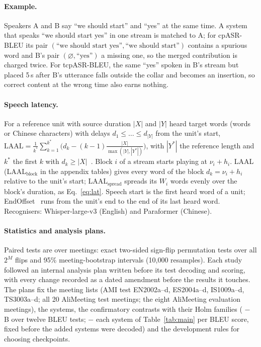 \paragraph{Example.} Speakers A and B say ``we should start'' and ``yes'' at the same time. A system that speaks
``we should start yes'' in one stream is matched to A; for cpASR-BLEU its pair $(\text{``we should start yes''},
\text{``we should start''})$ contains a spurious word and B's pair $(\varnothing,\text{``yes''})$ a missing one, so the
merged contribution is charged twice. For tcpASR-BLEU, the same ``yes'' spoken in B's stream but placed 5\,s after B's
utterance falls outside the collar and becomes an insertion, so correct content at the wrong time also earns nothing.

\paragraph{Speech latency.} For a reference unit with source duration $|X|$ and $|Y|$ heard target words (words or
Chinese characters) with delays $d_1\le\dots\le d_{|Y|}$ from the unit's start,
$\mathrm{LAAL}=\frac{1}{k^\ast}\sum_{k=1}^{k^\ast}\big(d_k-(k-1)\frac{|X|}{\max(|Y|,|Y^\ast|)}\big)$, with $|Y^\ast|$ the
reference length and $k^\ast$ the first $k$ with $d_k\ge|X|$~\citep{papi2022over}. Block $i$ of a stream starts
playing at $\nu_i+h_i$. LAAL (LAAL$_\text{block}$ in the appendix tables) gives every word of the block
$d_k=\nu_i+h_i$ relative to the unit's start; LAAL$_\text{spread}$ spreads its $W_i$ words evenly over the block's
duration, as Eq.~\eqref{eq:lat}. Speech start is the first heard word of a unit; EndOffset~\citep{ma2020simuleval} runs
from the unit's end to the end of its last heard word. Recognisers: Whisper-large-v3 (English) and Paraformer
(Chinese).

\paragraph{Statistics and analysis plans.} Paired tests are over meetings: exact two-sided sign-flip permutation tests
over all $2^M$ flips and 95\% meeting-bootstrap intervals (10{,}000 resamples). Each study followed an internal analysis
plan written before its test decoding and scoring, with every change recorded as a dated amendment before the results
it touches. The plans fix the meeting lists (AMI test EN2002a--d, ES2004a--d, IS1009a--d, TS3003a--d; all 20 AliMeeting
test meetings; the eight AliMeeting evaluation meetings), the systems, the confirmatory contrasts with their Holm
families (\sys{} $-$ B over twelve BLEU tests; \sys{} $-$ each system of Table~\ref{tab:main} per BLEU score, fixed
before the added systems were decoded) and the development rules for choosing checkpoints.

